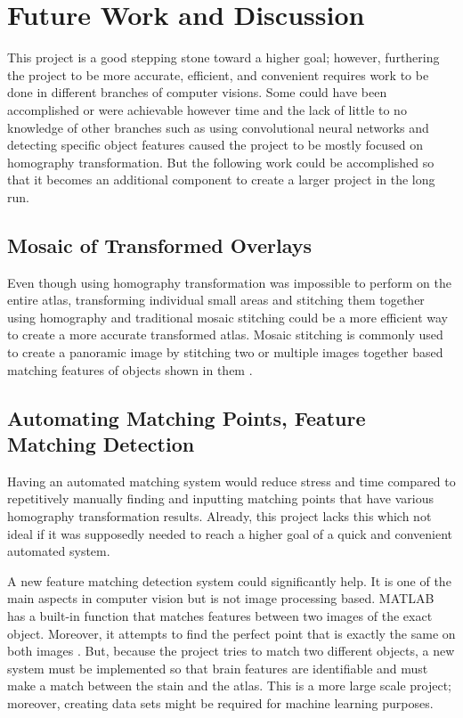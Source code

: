 \documentclass[10pt,twocolumn]{article}
\begin{document}
\section{Future Work and Discussion}
This project is a good stepping stone toward a higher goal; however, furthering the project to be more accurate, efficient, and convenient requires work to be done in different branches of computer visions. Some could have been accomplished or were achievable however time and the lack of little to no knowledge of other branches such as using convolutional neural networks and detecting specific object features caused the project to be mostly focused on homography transformation. But the following work could be accomplished so that it becomes an additional component to create a larger project in the long run. 

\subsection{Mosaic of Transformed Overlays}
Even though using homography transformation was impossible to perform on the entire atlas, transforming individual small areas and stitching them together using homography and traditional mosaic stitching could be a more efficient way to create a more accurate transformed atlas. Mosaic stitching is commonly used to create a panoramic image by stitching two or multiple images together based matching features of objects shown in them \cite{Abbadi_2021}. 

\subsection{Automating Matching Points, Feature Matching Detection}
Having an automated matching system would reduce stress and time compared to repetitively manually finding and inputting matching points that have various homography transformation results. Already, this project lacks this which not ideal if it was supposedly needed to reach a higher goal of a quick and convenient automated system. 

A new feature matching detection system could significantly help. It is one of the main aspects in computer vision but is not image processing based. MATLAB has a built-in function that matches features between two images of the exact object. Moreover, it attempts to find the perfect point that is exactly the same on both images \cite{lowe}. But, because the project tries to match two different objects, a new system must be implemented so that brain features are identifiable and must make a match between the stain and the atlas. This is a more large scale project; moreover, creating data sets might be required for machine learning purposes.
\end{document}
